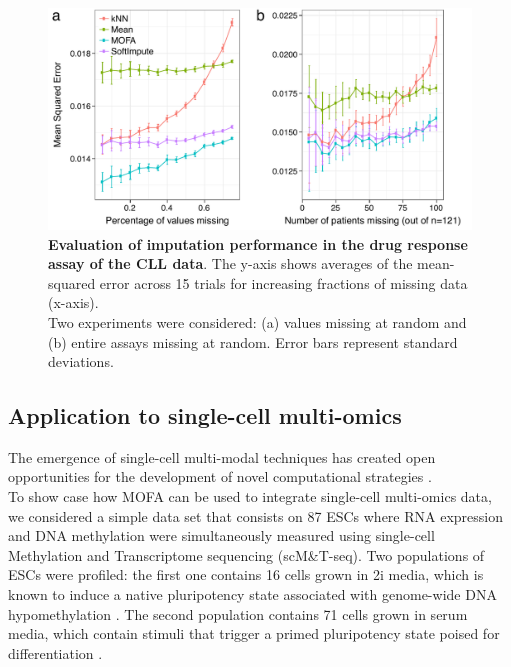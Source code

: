 \begin{figure}[H]
	\centering 	
	\includegraphics[width=1.0\textwidth]{MOFA_imputation}
	\caption{\textbf{Evaluation of imputation performance in the drug response assay of the CLL data}. The y-axis shows averages of the mean-squared error across 15 trials for increasing fractions of missing data (x-axis).\\
	Two experiments were considered: (a) values missing at random and (b) entire assays missing at random. Error bars represent standard deviations.}
	\label{fig:MOFA_imputation}
\end{figure}


\newpage

\subsection{Application to single-cell multi-omics} \label{section:mofa_scmt}

The emergence of single-cell multi-modal techniques has created open opportunities for the development of novel computational strategies \cite{Stuart2019,Colome-Tatche2018,Chappell2018}.\\
To show case how MOFA can be used to integrate single-cell multi-omics data, we considered a simple data set that consists on 87 ESCs where RNA expression and DNA methylation were simultaneously measured using single-cell Methylation and Transcriptome sequencing (scM\&T-seq)\cite{Angermueller2016}. Two populations of ESCs were profiled: the first one contains 16 cells grown in 2i media, which is known to induce a native pluripotency state associated with genome-wide DNA hypomethylation \cite{Ficz2013}. The second population contains 71 cells grown in serum media, which contain stimuli that trigger a primed pluripotency state poised for differentiation \cite{Tosolini2016}.

